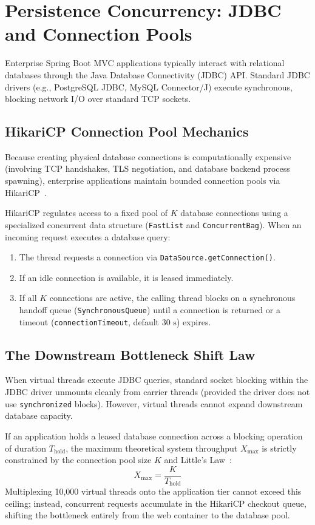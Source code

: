 \section{Persistence Concurrency: JDBC and Connection Pools}
\label{sec:persistence-concurrency}

Enterprise Spring Boot MVC applications typically interact with relational databases through the Java Database Connectivity (JDBC) API. Standard JDBC drivers (e.g., PostgreSQL JDBC, MySQL Connector/J) execute synchronous, blocking network I/O over standard TCP sockets.

\subsection{HikariCP Connection Pool Mechanics}
Because creating physical database connections is computationally expensive (involving TCP handshakes, TLS negotiation, and database backend process spawning), enterprise applications maintain bounded connection pools via HikariCP~\cite{HikariCPReference}.

HikariCP regulates access to a fixed pool of $K$ database connections using a specialized concurrent data structure (\texttt{FastList} and \texttt{ConcurrentBag}). When an incoming request executes a database query:
\begin{enumerate}
  \item The thread requests a connection via \texttt{DataSource.getConnection()}.
  \item If an idle connection is available, it is leased immediately.
  \item If all $K$ connections are active, the calling thread blocks on a synchronous handoff queue (\texttt{SynchronousQueue}) until a connection is returned or a timeout (\texttt{connectionTimeout}, default $30\text{ s}$) expires.
\end{enumerate}

\subsection{The Downstream Bottleneck Shift Law}
When virtual threads execute JDBC queries, standard socket blocking within the JDBC driver unmounts cleanly from carrier threads (provided the driver does not use \texttt{synchronized} blocks). However, virtual threads cannot expand downstream database capacity.

If an application holds a leased database connection across a blocking operation of duration $T_{\text{hold}}$, the maximum theoretical system throughput $X_{\text{max}}$ is strictly constrained by the connection pool size $K$ and Little's Law~\cite{Little1961}:
\begin{equation}
  \label{eq:pool-capacity}
  X_{\text{max}} = \frac{K}{T_{\text{hold}}}
\end{equation}
Multiplexing 10,000 virtual threads onto the application tier cannot exceed this ceiling; instead, concurrent requests accumulate in the HikariCP checkout queue, shifting the bottleneck entirely from the web container to the database pool.


